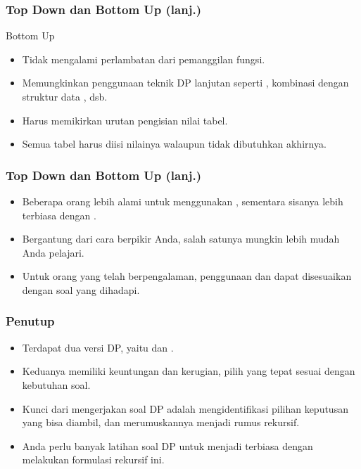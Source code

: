 \begin{frame}
\frametitle{Top Down dan Bottom Up (lanj.)}
Bottom Up
\begin{itemize}
  \item Tidak mengalami perlambatan dari \foverhead pemanggilan fungsi.
  \item Memungkinkan penggunaan teknik DP lanjutan seperti , kombinasi dengan struktur data , dsb.
  \item Harus memikirkan urutan pengisian nilai tabel.
  \item Semua tabel harus diisi nilainya walaupun tidak dibutuhkan akhirnya.
\end{itemize}
\end{frame}

\begin{frame}
\frametitle{Top Down dan Bottom Up (lanj.)}
\begin{itemize}
  \item Beberapa orang lebih alami untuk menggunakan \ftopdown, sementara sisanya lebih terbiasa dengan \fbottomup.
  \item Bergantung dari cara berpikir Anda, salah satunya mungkin lebih mudah Anda pelajari.
  \item Untuk orang yang telah berpengalaman, penggunaan \fbottomup dan \ftopdown dapat disesuaikan dengan soal yang dihadapi.
\end{itemize}
\end{frame}

\begin{frame}
\frametitle{Penutup}
\begin{itemize}
  \item Terdapat dua versi DP, yaitu \ftopdown dan \fbottomup.
  \item Keduanya memiliki keuntungan dan kerugian, pilih yang tepat sesuai dengan kebutuhan soal.
  \item Kunci dari mengerjakan soal DP adalah mengidentifikasi pilihan keputusan yang bisa diambil, dan merumuskannya menjadi rumus rekursif.
  \item Anda perlu banyak latihan soal DP untuk menjadi terbiasa dengan melakukan formulasi rekursif ini.
\end{itemize}
\end{frame}


